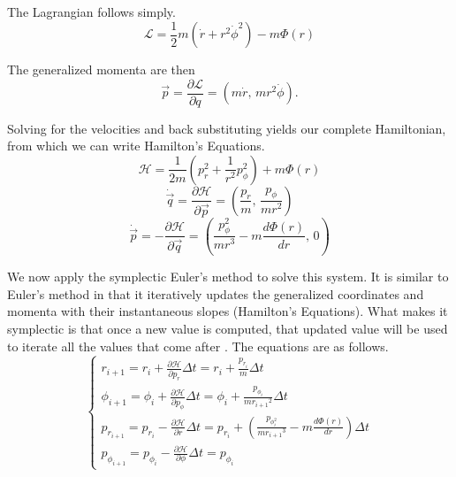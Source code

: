 \documentclass[11pt, twocolumn]{article}
\newcommand{\ff}[2]{\frac{#1}{#2}}
\newcommand{\ca}[1]{\begin{cases}#1\end{cases}}
\newcommand{\df}[2]{\ff{d #1}{d #2}}
\begin{document}
    The Lagrangian follows simply.
    \begin{equation} \mathcal{L} = \frac{1}{2}m(\dot{r} + r^2\dot{\phi}^2) - m\Phi (r) \end{equation}

    The generalized momenta are then
    \begin{equation} \vec{p} = \frac{\partial \mathcal{L}}{\partial q} = (m\dot{r}, \, mr^2\dot{\phi}).
    \end{equation}

    Solving for the velocities and back substituting yields our complete Hamiltonian, from which we can write Hamilton's Equations.
    \begin{equation} \mathcal{H} = \frac{1}{2m}(p_r^2 + \frac{1}{r^2}p_\phi^2) + m\Phi (r) \end{equation}
    \begin{equation} \dot{\vec{q}} = \frac{\partial \mathcal{H}}{\partial \vec{p}} = (\frac{p_r}{m}, \, \frac{p_\phi}{mr^2}) \end{equation}
    \begin{equation} \dot{\vec{p}} = -\frac{\partial \mathcal{H}}{\partial \vec{q}} = (\frac{p_\phi^2}{mr^3} - m\df{\Phi (r)}{r}, \, 0) \end{equation}

    We now apply the symplectic Euler's method to solve this system. It is similar to Euler's method in that it iteratively updates the generalized coordinates and momenta with their instantaneous slopes (Hamilton's Equations). What makes it symplectic is that once a new value is computed, that updated value will be used to iterate all the values that come after \parencite{donnelly_symplectic_2005}. The equations are as follows.  
    \begin{equation}
        \ca{
        r_{i + 1} = r_i + \frac{\partial \mathcal{H}}{\partial p_r}\Delta t = r_i + \frac{p_{r_i}}{m}\Delta t\\
        \phi_{i + 1} = \phi_i + \frac{\partial \mathcal{H}}{\partial p_\phi}\Delta t = \phi_i + \frac{p_{\phi_{i}}}{m{r_{i + 1}}^2}\Delta t \\
        p_{r_{i + 1}} = p_{r_i} - \frac{\partial \mathcal{H}}{\partial r}\Delta t = p_{r_i} + (\frac{p_\phi_i^2}{m{r_{i+1}}^3} - m\df{\Phi (r)}{r})\Delta t \\
        p_{\phi_{i + 1}} = p_{\phi_i} - \frac{\partial \mathcal{H}}{\partial \phi}\Delta t = p_{\phi_i} }
    \end{equation}
\end{document}
